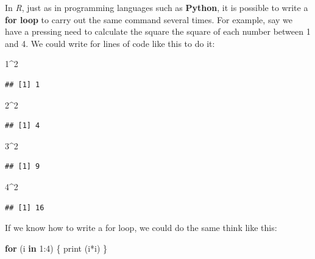 \documentclass[
]{book}
\newenvironment{Shaded}{\begin{snugshade}}{\end{snugshade}}
\newcommand{\ControlFlowTok}[1]{\textcolor[rgb]{0.13,0.29,0.53}{\textbf{#1}}}
\newcommand{\DecValTok}[1]{\textcolor[rgb]{0.00,0.00,0.81}{#1}}
\newcommand{\FunctionTok}[1]{\textcolor[rgb]{0.00,0.00,0.00}{#1}}
\newcommand{\NormalTok}[1]{#1}
\newcommand{\SpecialCharTok}[1]{\textcolor[rgb]{0.00,0.00,0.00}{#1}}
\begin{document}
In \emph{R}, just as in programming languages such as \textbf{Python}, it is possible to write a \textbf{for loop} to carry out the same command several times. For example, say we have a pressing need to calculate the square the square of each number between 1 and 4. We could write for lines of code like this to do it:

\begin{Shaded}
\begin{Highlighting}[]
\DecValTok{1}\SpecialCharTok{\^{}}\DecValTok{2}
\end{Highlighting}
\end{Shaded}

\begin{verbatim}
## [1] 1
\end{verbatim}

\begin{Shaded}
\begin{Highlighting}[]
\DecValTok{2}\SpecialCharTok{\^{}}\DecValTok{2}
\end{Highlighting}
\end{Shaded}

\begin{verbatim}
## [1] 4
\end{verbatim}

\begin{Shaded}
\begin{Highlighting}[]
\DecValTok{3}\SpecialCharTok{\^{}}\DecValTok{2}
\end{Highlighting}
\end{Shaded}

\begin{verbatim}
## [1] 9
\end{verbatim}

\begin{Shaded}
\begin{Highlighting}[]
\DecValTok{4}\SpecialCharTok{\^{}}\DecValTok{2}
\end{Highlighting}
\end{Shaded}

\begin{verbatim}
## [1] 16
\end{verbatim}

If we know how to write a for loop, we could do the same think like this:

\begin{Shaded}
\begin{Highlighting}[]
\ControlFlowTok{for}\NormalTok{ (i }\ControlFlowTok{in} \DecValTok{1}\SpecialCharTok{:}\DecValTok{4}\NormalTok{) \{ }
  \FunctionTok{print}\NormalTok{ (i}\SpecialCharTok{*}\NormalTok{i) }
\NormalTok{  \}}
\end{Highlighting}
\end{Shaded}
\end{document}
